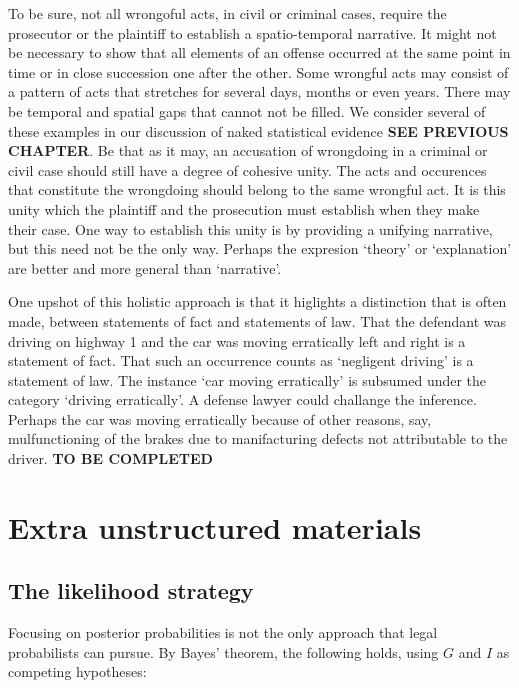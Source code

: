 \documentclass[10pt,dvipsnames,enabledeprecatedfontcommands]{scrartcl}
\begin{document}
To be sure, not all wrongoful acts, in civil or criminal cases, require
the prosecutor or the plaintiff to establish a spatio-temporal
narrative. It might not be necessary to show that all elements of an
offense occurred at the same point in time or in close succession one
after the other. Some wrongful acts may consist of a pattern of acts
that stretches for several days, months or even years. There may be
temporal and spatial gaps that cannot not be filled. We consider several
of these examples in our discussion of naked statistical evidence
\textbf{SEE PREVIOUS CHAPTER}. Be that as it may, an accusation of
wrongdoing in a criminal or civil case should still have a degree of
cohesive unity. The acts and occurences that constitute the wrongdoing
should belong to the same wrongful act. It is this unity which the
plaintiff and the prosecution must establish when they make their case.
One way to establish this unity is by providing a unifying narrative,
but this need not be the only way. Perhaps the expresion `theory' or
`explanation' are better and more general than `narrative'.

One upshot of this holistic approach is that it higlights a distinction
that is often made, between statements of fact and statements of law.
That the defendant was driving on highway 1 and the car was moving
erratically left and right is a statement of fact. That such an
occurrence counts as `negligent driving' is a statement of law. The
instance `car moving erratically' is subsumed under the category
`driving erratically'. A defense lawyer could challange the inference.
Perhaps the car was moving erratically because of other reasons, say,
mulfunctioning of the brakes due to manifacturing defects not
attributable to the driver. \textbf{TO BE COMPLETED}

\hypertarget{extra-unstructured-materials}{%
\section{Extra unstructured
materials}\label{extra-unstructured-materials}}

\hypertarget{the-likelihood-strategy}{%
\subsection{The likelihood strategy}\label{the-likelihood-strategy}}

Focusing on posterior probabilities is not the only approach that legal
probabilists can pursue. By Bayes' theorem, the following holds, using
\(G\) and \(I\) as competing hypotheses:
\end{document}
